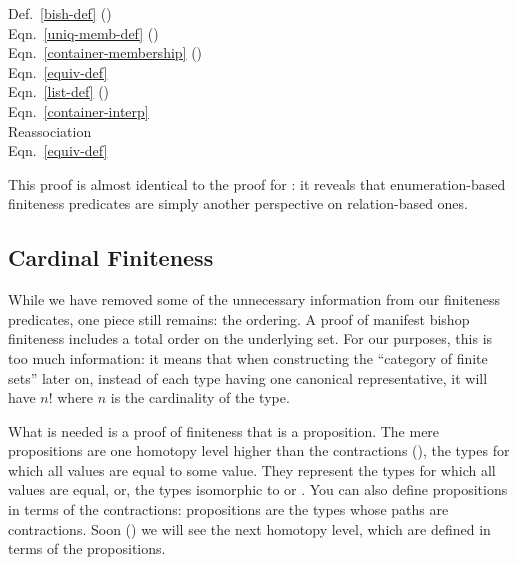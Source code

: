 \begin{minipage}[t]{.83\textwidth}\vspace{-1.25\baselineskip}
\end{minipage}
\begin{minipage}[t]{.16\textwidth}
  Def.~\ref{bish-def} ()     \\
  Eqn.~\ref{uniq-memb-def} (\AgdaDatatype{\ensuremath{\in!}})       \\
  Eqn.~\ref{container-membership} (\AgdaDatatype{\ensuremath{\in}}) \\
  Eqn.~\ref{equiv-def} \\
  Eqn.~\ref{list-def} ({}) \\
  Eqn.~\ref{container-interp}  \\
  Reassociation \\
  Eqn.~\ref{equiv-def}
\end{minipage}

This proof is almost identical to the proof for
: it reveals that
enumeration-based finiteness predicates are simply another perspective on
relation-based ones.

\subsection{Cardinal Finiteness}\label{cardinal-finiteness}
While we have removed some of the unnecessary information from our finiteness
predicates, one piece still remains: the ordering.
A proof of manifest bishop finiteness includes a total order on the underlying
set.
For our purposes, this is too much information: it means that when constructing
the ``category of finite sets'' later on, instead of each type having one
canonical representative, it will have $n!$ where $n$ is the cardinality of
the type\footnotemark.


What is needed is a proof of finiteness that is a proposition.
The mere propositions are one homotopy level higher than the contractions
(), the types for which all values are equal to some value.
They represent the types for which all values are equal, or, the types
isomorphic to \agdabot\;or \agdatop.
You can also define propositions in terms of the contractions: propositions are
the types whose paths are contractions.
Soon () we will see the next homotopy level, which are
defined in terms of the propositions.

